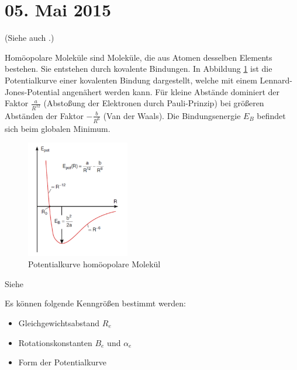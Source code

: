 \section{05. Mai 2015}

\label{q:11}

(Siehe auch .)

Homöopolare Moleküle sind Moleküle, die aus Atomen desselben Elements bestehen. Sie entstehen durch kovalente Bindungen. In Abbildung \ref{fig:Frage_11} ist die Potentialkurve einer kovalenten Bindung dargestellt, welche mit einem Lennard-Jones-Potential angenähert werden kann. Für kleine Abstände dominiert der Faktor $\frac{a}{R^12}$ (Abstoßung der Elektronen durch Pauli-Prinzip) bei größeren Abständen der Faktor $-\frac{b}{R^6}$ (Van der Waals). Die Bindungsenergie $E_B$ befindet sich beim globalen Minimum. 
\begin{figure}[H]
    \centering
    \includegraphics[width = 0.4\textwidth]{resources/05-05-2015/Frage_11.png}
    \caption{Potentialkurve homöopolare Molekül}
    \label{fig:Frage_11}
\end{figure}


\label{q:12}

Siehe 

\label{q:13}

Es können folgende Kenngrößen bestimmt werden:
\begin{itemize}
    \item Gleichgewichtsabstand $R_e$
    \item Rotationskonstanten $B_e$ und $\alpha_e$
    \item Form der Potentialkurve
\end{itemize}

